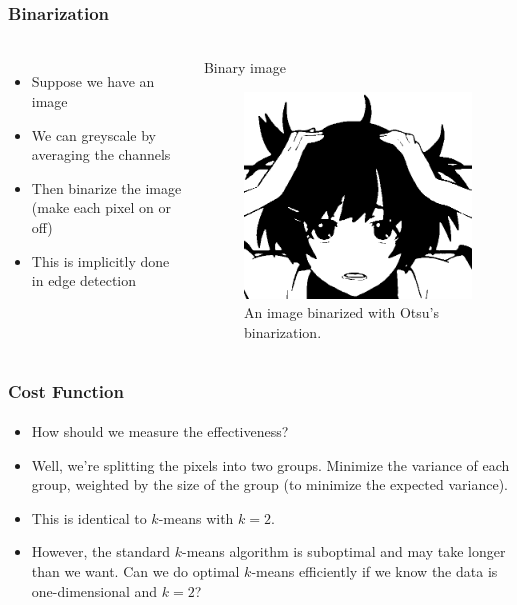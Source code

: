 \documentclass{beamer}                             %
\begin{document}
\begin{frame}
\frametitle{Binarization}
\framesubtitle{}
\begin{columns}
  \begin{itemize}
    \item Suppose we have an image  
    \item We can greyscale by averaging the channels
    \item Then \alert{binarize} the image (make each pixel on or off)
    \item This is implicitly done in edge detection
  \end{itemize}
  \begin{exampleblock}{Binary image} 
    \begin{figure}[h!]
      \centering
      \includegraphics[scale=0.25]{hanekawa_binary}
      \caption{An image binarized with Otsu's binarization.}
    \end{figure}
  \end{exampleblock}
\end{columns}
\end{frame}

\begin{frame}
\frametitle{Cost Function}
\framesubtitle{}
\begin{itemize}[<+->]
    \item How should we measure the effectiveness?
    \item Well, we're splitting the pixels into two groups.
      Minimize the variance of each group, weighted by the
      size of the group (to minimize the expected variance).
    \item This is identical to \( k \)-means with \( k = 2 \).
    \item  However, the standard \( k \)-means algorithm is suboptimal and
      may take longer than we want. Can we do optimal \( k \)-means
      efficiently if we know the data is one-dimensional and \( k = 2 \)?
  \end{itemize}
\end{frame}
\end{document}
